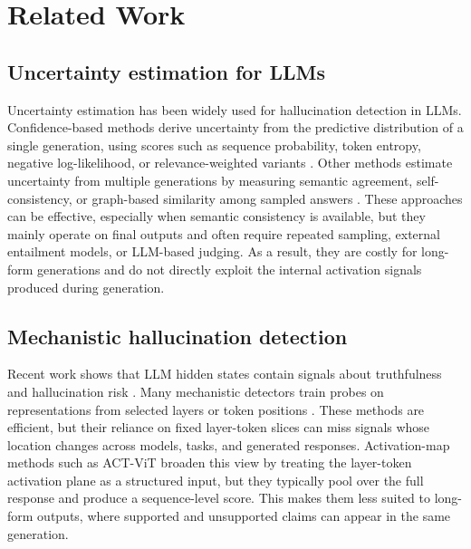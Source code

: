 \section{Related Work}

\subsection{Uncertainty estimation for LLMs}

Uncertainty estimation has been widely used for hallucination
detection in LLMs. Confidence-based methods derive uncertainty from
the predictive distribution of a single generation, using scores such
as sequence probability, token entropy, negative log-likelihood, or
relevance-weighted variants
\citep{malinin2021uncertainty,duan2024shifting,schweighofer2025rethinking}.
Other methods estimate uncertainty from multiple generations by
measuring semantic agreement, self-consistency, or graph-based
similarity among sampled answers
\citep{kuhn2023semantic,lin2024generating,jiang2024,manakul2023,band2024}.
These approaches can be effective, especially when semantic
consistency is available, but they mainly operate on final outputs and
often require repeated sampling, external entailment models, or
LLM-based judging. As a result, they are costly for long-form
generations and do not directly exploit the internal activation
signals produced during generation.

\subsection{Mechanistic hallucination detection}

Recent work shows that LLM hidden states contain signals about
truthfulness and hallucination risk
\citep{marks2023,azaria2023,liu2024,ji2024}. Many mechanistic
detectors train probes on representations from selected layers or
token positions
\citep{kadavath2022,snyder2024,zou2023,li2024}. These methods are
efficient, but their reliance on fixed layer-token slices can miss
signals whose location changes across models, tasks, and generated
responses. Activation-map methods such as ACT-ViT
\citep{barshalom2025} broaden this view by treating the layer-token
activation plane as a structured input, but they typically pool over
the full response and produce a sequence-level score. This makes them
less suited to long-form outputs, where supported and unsupported
claims can appear in the same generation.

